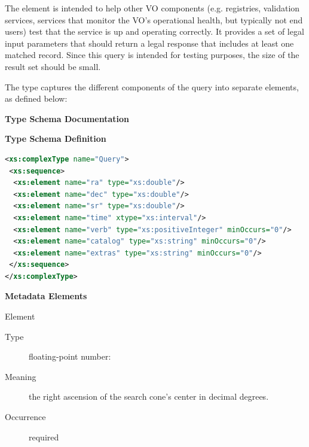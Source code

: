 \documentclass[11pt,a4paper]{ivoa}
\begin{document}
The  element is intended to help other VO components
(e.g.  registries, validation services, services that monitor the VO's
operational health, but typically not end users) test that the service
is up and operating correctly. It provides a set of legal input
parameters that should return a legal response that includes at least
one matched record. Since this query is intended for testing purposes,
the size of the result set should be small.

The  type captures the different components of the query
into separate elements, as defined below:

\begin{generated} \begingroup \renewcommand*{}\vspace{2ex}\noindent\textbf{ Type Schema Documentation}


\vspace{1ex}\noindent\textbf{ Type Schema Definition}

\begin{lstlisting}[language=XML,basicstyle=\footnotesize]
<xs:complexType name="Query">
 <xs:sequence>
  <xs:element name="ra" type="xs:double"/>
  <xs:element name="dec" type="xs:double"/>
  <xs:element name="sr" type="xs:double"/>
  <xs:element name="time" xtype="xs:interval"/>
  <xs:element name="verb" type="xs:positiveInteger" minOccurs="0"/>
  <xs:element name="catalog" type="xs:string" minOccurs="0"/>
  <xs:element name="extras" type="xs:string" minOccurs="0"/>
 </xs:sequence>
</xs:complexType>
\end{lstlisting}

\vspace{0.5ex}\noindent\textbf{ Metadata Elements}

\begingroup
\small

\begin{bigdescription}

	\item[Element \xmlel{ra}]
	\begin{description}
		\item[Type] floating-point number: 
		\item[Meaning] the right ascension of the search cone's center in
decimal degrees.             
		\item[Occurrence] required
	\end{description} \


\end{bigdescription}
\end{generated}
\end{document}
